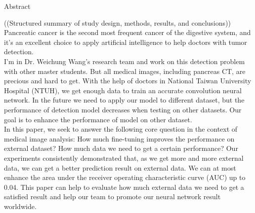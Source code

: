 


\doublespacing

\begin{center}
\Large{{Abstract}}\\
\end{center}
((Structured summary of study design, methods, results, and conclusions))\\
Pancreatic  cancer  is  the  second  most  frequent  cancer  of  the digestive  system, and it's an excellent choice to apply artificial intelligence to help doctors with tumor detection. \\
I'm in Dr. Weichung Wang's research team and work on this detection problem with other master students. But all medical images, including pancreas CT, are precious and hard to get. With the help of doctors in National Taiwan University Hospital (NTUH), we get enough data to  train an accurate convolution neural network. In the future we need to apply our model to different dataset, but the performance of detection model decreases when testing on other datasets. Our goal is to enhance the performance of model on other dataset. \\
In this paper, we seek to answer the following core question in the context of medical image analysis: How much fine-tuning improves the performance on external dataset? How much data we need to get a certain performance? Our experiments consistently demonstrated that, as we get more and more external data, we can get a better prediction result on external data. We can at most enhance the area under the receiver operating characteristic curve (AUC) up to 0.04. This paper can help to evaluate how much external data we need to get a satisfied result and help our team to promote our neural network result worldwide.

